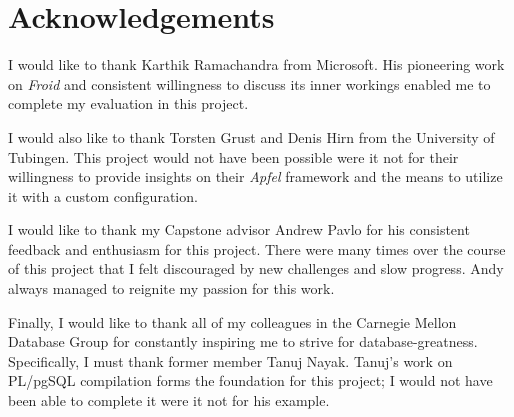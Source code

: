 \documentclass{vldb}
\newcommand{\plpgsql}{PL/pgSQL\xspace}
\begin{document}
\section{Acknowledgements}

I would like to thank Karthik Ramachandra from Microsoft. His pioneering work on \textit{Froid} and consistent willingness to discuss its inner workings enabled me to complete my evaluation in this project.

I would also like to thank Torsten Grust and Denis Hirn from the University of Tubingen. This project would not have been possible were it not for their willingness to provide insights on their \textit{Apfel} framework and the means to utilize it with a custom configuration. 

I would like to thank my Capstone advisor Andrew Pavlo for his consistent feedback and enthusiasm for this project. There were many times over the course of this project that I felt discouraged by new challenges and slow progress. Andy always managed to reignite my passion for this work.

Finally, I would like to thank all of my colleagues in the Carnegie Mellon Database Group for constantly inspiring me to strive for database-greatness. Specifically, I must thank former member Tanuj Nayak. Tanuj's work on \plpgsql compilation forms the foundation for this project; I would not have been able to complete it were it not for his example.


\newcommand{\newblock}{}

\clearpage


\end{document}
